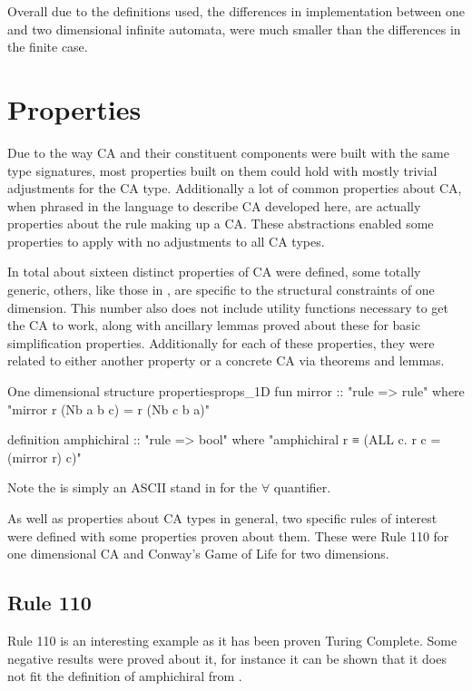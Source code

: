 Overall due to the definitions used,
the differences in implementation between one and two dimensional infinite automata,
were much smaller than the differences in the finite case.


\section{Properties}

Due to the way CA and their constituent components were built with the same type signatures,
most properties built on them could hold with mostly trivial adjustments for the CA type.
Additionally a lot of common properties about CA, 
when phrased in the language to describe CA developed here,
are actually properties about the rule making up a CA.
These abstractions enabled some properties to apply with no adjustments to all CA types.

In total about sixteen distinct properties of CA were defined,
some totally generic,
others,
like those in ,
are specific to the structural constraints of one dimension.
This number also does not include utility functions necessary to get the CA to work,
along with ancillary lemmas proved about these for basic simplification properties.
Additionally for each of these properties,
they were related to either another property or a concrete CA via theorems and lemmas.

\begin{myminted}{One dimensional structure properties}{props_1D}
    fun mirror :: "rule => rule" where
    "mirror r (Nb a b c) = r (Nb c b a)"

    definition amphichiral :: "rule => bool" where
    "amphichiral r ≡ (ALL c. r c = (mirror r) c)"
\end{myminted}

Note the  is simply an ASCII stand in for the $\forall$ quantifier.


As well as properties about CA types in general,
two specific rules of interest were defined with some properties proven about them.
These were Rule 110 for one dimensional CA and Conway's Game of Life for two dimensions.

\subsection{Rule 110}
Rule 110 is an interesting example as it has been proven Turing Complete.
Some negative results were proved about it,
for instance it can be shown that it does not fit the definition of amphichiral from .

